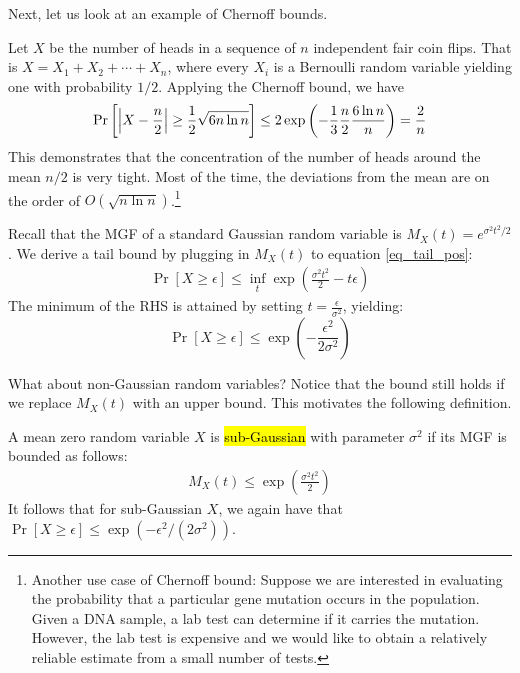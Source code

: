 Next, let us look at an example of Chernoff bounds.

\begin{example}
Let $X$ be the number of heads in a sequence of $n$ independent fair coin flips.
That is $X = X_1 + X_2 + \cdots + X_n$, where every $X_i$ is a Bernoulli random variable yielding one with probability $1/2$.
Applying the Chernoff bound, we have
\[ \Pr\left[ {\left| {X - \frac n 2} \right|} \ge \frac 1 2 \sqrt{6n\ln n} \right] \le 2\exp\left( - \frac 1 3 \frac n 2  \frac {6\ln n}{n}\right) = \frac 2 n \]
This demonstrates that the concentration of the number of heads around the mean $n/2$ is very tight.
Most of the time, the deviations from the mean are on the order of $O(\sqrt {n \ln n})$.\footnote{Another use case of Chernoff bound: Suppose we are interested in evaluating the probability that a particular gene mutation occurs in the population.
Given a DNA sample, a lab test can determine if it carries the mutation.
However, the lab test is expensive and we would like to obtain a relatively reliable estimate from a small number of tests.}
\end{example}

\begin{example}
    Recall that the MGF of a standard Gaussian random variable is $M_X(t) = e^{\sigma^2 t^2 / 2}$.
    We derive a tail bound by plugging in $M_X(t)$ to equation \eqref{eq_tail_pos}:
    \begin{align*}
        \Pr[X \ge \epsilon] \le \inf_t \exp\left(\frac {\sigma^2 t^2} 2 - t\epsilon \right)
    \end{align*}
    The minimum of the RHS is attained by setting $t = \frac{\epsilon} {\sigma^2}$, yielding:
    \[ \Pr[X \ge \epsilon] \le \exp\left( -\frac{ \epsilon^2} {2\sigma^2} \right) \]
\end{example}

What about non-Gaussian random variables? Notice that the bound still holds if we replace $M_X(t)$ with an upper bound.
This motivates the following definition.

\begin{definition}
    A mean zero random variable $X$ is \hl{sub-Gaussian} with parameter $\sigma^2$ if its MGF is bounded as follows:
    \begin{align}
        M_X(t) \le \exp\left(\frac{\sigma^2 t^2}2\right)
    \end{align}
    It follows that for sub-Gaussian $X$, we again have that $\Pr[X \ge \epsilon] \le \exp(-\epsilon^2 /(2\sigma^2))$.
\end{definition}

